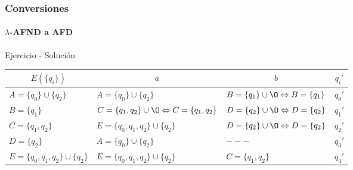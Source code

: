 \documentclass{beamer}
\begin{document}
        \begin{frame}
			\frametitle{Conversiones}
			\framesubtitle{$\lambda$-AFND a AFD}
           
           \begin{exampleblock}{Ejercicio - Soluci\'on}
               \begin{table}
                   \begin{center}
                      {\tiny
                       \begin{tabular}{l|l|lc} 
                           \multicolumn{1}{c|}{$E(\{q_{i}\})$} & \multicolumn{1}{c}{$a$} & \multicolumn{1}{|c}{$b$} & \multicolumn{1}{|c}{$q_{i}'$} \\ \hline
                          $A=\{q_{0}\} \cup \{q_{2}\}$ & $A=\{q_{0}\} \cup \{q_{2}\}$ & $B=\{q_{1}\} \cup \O \Leftrightarrow B=\{q_{1}\} $ & $q_{0}'$ \\
                          $B=\{q_{1}\}$  & $C=\{q_{1},q_{2}\} \cup \O \Leftrightarrow C=\{q_{1},q_{2}\}$ & $D=\{q_{2}\} \cup \O \Leftrightarrow D=\{q_{2}\}$ & $q_{1}'$ \\
                          $C=\{q_{1},q_{2}\}$ & $E=\{q_{0},q_{1},q_{2}\} \cup \{q_{2}\}$ & $D=\{q_{2}\} \cup \O \Leftrightarrow D=\{q_{2}\}$ & $q_{2}'$ \\
                          $D=\{q_{2}\}$ &  $A=\{q_{0}\} \cup \{q_{2}\}$ & $---$ & $q_{3}'$ \\
                          $E=\{q_{0},q_{1},q_{2}\} \cup \{q_{2}\}$ & $E=\{q_{0},q_{1},q_{2}\} \cup \{q_{2}\}$ & $C=\{q_{1},q_{2}\}$ & $q_{4}'$ \\
                       \end{tabular}}
                   \end{center}
               \end{table}
            \end{exampleblock}
		\end{frame}	
\end{document}
